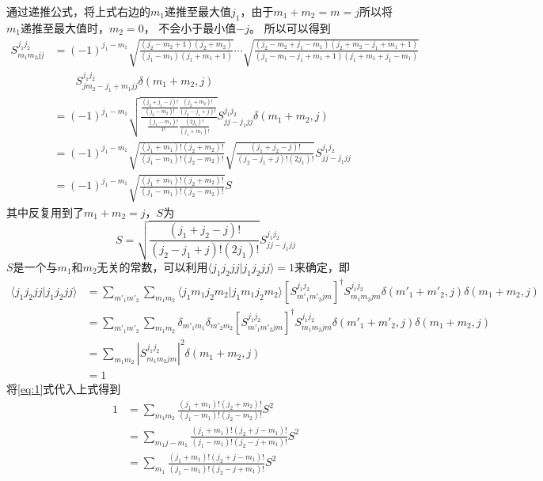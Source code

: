 \documentclass{article}
\begin{document}
通过递推公式，将上式右边的$m_1$递推至最大值$j_1$，由于$m_1+m_2=m=j$所以将$m_1$递推至最大值时，$m_2=0$，
不会小于最小值$-j$。
所以可以得到
\begin{equation}\label{eq:1}
    \begin{aligned}
        S_{m_1 m_2 jj}^{j_1 j_2}
        &=(-1)^{j_1-m_1}\sqrt{\frac{(j_2-m_2+1)(j_2+m_2)}{(j_1-m_1)(j_1+m_1+1)}}\cdots
        \sqrt{\frac{(j_2-m_2+j_1-m_1)(j_2+m_2-j_1+m_1+1)}{(j_1-m_1-j_1+m_1+1)(j_1+m_1+j_1-m_1)}}\\
        &\qquad S_{j m_2-j_1+m_1 jj}^{j_1 j_2}\delta(m_1+m_2,j)\\
        &=(-1)^{j_1-m_1}\sqrt{\frac{\frac{(j_2+j_1-j)!}{(j_2-m_2)!}\frac{(j_2+m_2)!}{(j_2-j_1+j)!}}
        {\frac{(j_1-m_1)!}{1!}\frac{(2j_1)!}{(j_1+m_1)!}}}
        S_{j j-j_1 jj}^{j_1 j_2}\delta(m_1+m_2,j)\\
        &=(-1)^{j_1-m_1}\sqrt{\frac{(j_1+m_1)!(j_2+m_2)!}{(j_1-m_1)!(j_2-m_2)!}}
        \sqrt{\frac{(j_1+j_2-j)!}{(j_2-j_1+j)!(2j_1)!}}S_{j j-j_1 jj}^{j_1 j_2}\\
        &=(-1)^{j_1-m_1}\sqrt{\frac{(j_1+m_1)!(j_2+m_2)!}{(j_1-m_1)!(j_2-m_2)!}} S
    \end{aligned}
\end{equation}
其中反复用到了$m_1+m_2=j$，$S$为
\begin{equation}
    S=\sqrt{\frac{(j_1+j_2-j)!}{(j_2-j_1+j)!(2j_1)!}}S_{j j-j_1 jj}^{j_1 j_2}
\end{equation}
$S$是一个与$m_1$和$m_2$无关的常数，可以利用$\langle j_1 j_2 jj|j_1 j_2 jj\rangle=1$来确定，即
\begin{equation}
    \begin{aligned}
        \langle j_1 j_2 jj|j_1 j_2 jj\rangle
        &= \sum_{m'_1 m'_2}\sum_{m_1 m_2}\langle j_1 m_1 j_2 m_2|j_1 m_1 j_2 m_2\rangle
        [S_{m'_1 m'_2 jm}^{j_1 j_2}]^{\dagger}S_{m_1 m_2 jm}^{j_1 j_2}
        \delta(m'_1+m'_2,j)\delta(m_1+m_2,j)\\
        &= \sum_{m'_1 m'_2}\sum_{m_1 m_2}\delta_{m'_1 m_1}\delta_{m'_2 m_2}
        [S_{m'_1 m'_2 jm}^{j_1 j_2}]^{\dagger}S_{m_1 m_2 jm}^{j_1 j_2}
        \delta(m'_1+m'_2,j)\delta(m_1+m_2,j)\\
        &= \sum_{m_1 m_2}|S_{m_1 m_2 jm}^{j_1 j_2}|^2 \delta(m_1+m_2,j)\\
        &= 1
    \end{aligned}
\end{equation}
将\ref{eq:1}式代入上式得到
\begin{equation}\label{eq:3}
    \begin{aligned}
        1 &= \sum_{m_1 m_2}\frac{(j_1+m_1)!(j_2+m_2)!}{(j_1-m_1)!(j_2-m_2)!}S^2\\
        &= \sum_{m_1 j-m_1}\frac{(j_1+m_1)!(j_2+j-m_1)!}{(j_1-m_1)!(j_2-j+m_1)!}S^2\\
        &= \sum_{m_1}\frac{(j_1+m_1)!(j_2+j-m_1)!}{(j_1-m_1)!(j_2-j+m_1)!}S^2\\
    \end{aligned}
\end{equation}
\end{document}
